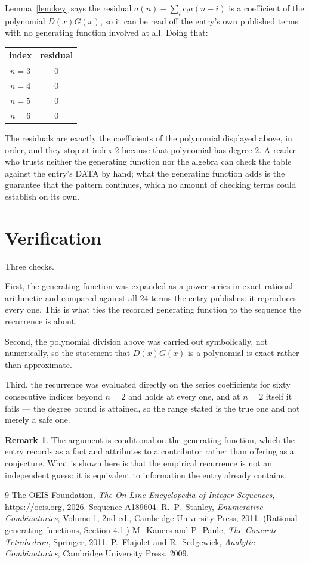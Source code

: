 \documentclass[11pt,a4paper]{article}
\theoremstyle{plain}
\theoremstyle{definition}
\newtheorem{remark}[theorem]{Remark}
\begin{document}
Lemma~\ref{lem:key} says the residual $a(n)-\sum_ic_ia(n-i)$ is a coefficient of the
polynomial $D(x)G(x)$, so it can be read off the entry's own published terms with no
generating function involved at all. Doing that:
\begin{center}
\begin{tabular}{cc}
index & residual \\ \hline
$n=3$ & $0$ \\
$n=4$ & $0$ \\
$n=5$ & $0$ \\
$n=6$ & $0$
\end{tabular}
\end{center}
The residuals are exactly the coefficients of the polynomial displayed above, in order, and
they stop at index $2$ because that polynomial has degree $2$. A reader who trusts
neither the generating function nor the algebra can check the table against the entry's DATA
by hand; what the generating function adds is the guarantee that the pattern continues, which
no amount of checking terms could establish on its own.

\section{Verification}

Three checks.

First, the generating function was expanded as a power series in exact rational arithmetic and
compared against all $24$ terms the entry publishes: it reproduces every one. This is
what ties the recorded generating function to the sequence the recurrence is about.

Second, the polynomial division above was carried out symbolically, not numerically, so the
statement that $D(x)G(x)$ is a polynomial is exact rather than approximate.

Third, the recurrence was evaluated directly on the series coefficients for sixty consecutive
indices beyond $n=2$ and holds at every one, and at $n=2$ itself it fails --- the
degree bound is attained, so the range stated is the true one and not merely a safe one.

\begin{remark}
The argument is conditional on the generating function, which the entry records as a fact and
attributes to a contributor rather than offering as a conjecture. What is shown here is that
the empirical recurrence is not an independent guess: it is equivalent to information the
entry already contains.
\end{remark}

\begin{thebibliography}{9}
 The OEIS Foundation, \emph{The On-Line Encyclopedia of Integer
Sequences}, \url{https://oeis.org}, 2026. Sequence A189604.
 R.~P.~Stanley, \emph{Enumerative Combinatorics}, Volume 1, 2nd ed.,
Cambridge University Press, 2011. (Rational generating functions, Section 4.1.)
 M.~Kauers and P.~Paule, \emph{The Concrete Tetrahedron}, Springer, 2011.
 P.~Flajolet and R.~Sedgewick, \emph{Analytic Combinatorics}, Cambridge
University Press, 2009.
\end{thebibliography}
\end{document}
